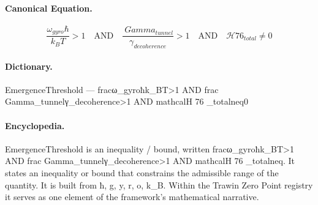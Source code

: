\paragraph{Canonical Equation.}
\[
\boxed{\frac{\omega_{gyro}\hbar}{k_BT}>1\quad\text{AND}\quad\frac{\ Gamma_{tunnel}}{\gamma_{decoherence}}>1\quad\text{AND}\quad\mathcal{H 76 }_{total}\neq0}
\]

\paragraph{Dictionary.}
EmergenceThreshold — fracω\_gyroħk\_BT>1 AND frac Gamma\_tunnelγ\_decoherence>1 AND mathcalH 76 \_totalneq0

\paragraph{Encyclopedia.}
EmergenceThreshold is an inequality / bound, written fracω\_gyroħk\_BT>1 AND frac Gamma\_tunnelγ\_decoherence>1 AND mathcalH 76 \_totalneq. It states an inequality or bound that constrains the admissible range of the quantity. It is built from ħ, g, y, r, o, k\_B. Within the Trawin Zero Point registry it serves as one element of the framework's mathematical narrative.
